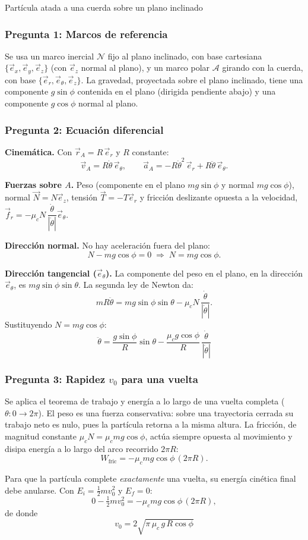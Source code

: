 \begin{solucion}{Partícula atada a una cuerda sobre un plano inclinado}
\subsubsection*{Pregunta 1: Marcos de referencia}

Se usa un marco inercial $\mathcal{N}$ fijo al plano inclinado, con base cartesiana
$\{\vec{e}_x,\vec{e}_y,\vec{e}_z\}$ (con $\vec{e}_z$ normal al plano), y un marco polar
$\mathcal{A}$ girando con la cuerda, con base $\{\vec{e}_r,\vec{e}_\theta,\vec{e}_z\}$. La
gravedad, proyectada sobre el plano inclinado, tiene una componente $g\sin\phi$ contenida en
el plano (dirigida pendiente abajo) y una componente $g\cos\phi$ normal al plano.

\subsubsection*{Pregunta 2: Ecuación diferencial}

\textbf{Cinemática.} Con $\vec{r}_A = R\,\vec{e}_r$ y $R$ constante:
$$\vec{v}_A = R\dot\theta\,\vec{e}_\theta,\qquad
\vec{a}_A = -R\dot\theta^2\,\vec{e}_r + R\ddot\theta\,\vec{e}_\theta.$$

\textbf{Fuerzas sobre $A$.} Peso (componente en el plano $mg\sin\phi$ y normal $mg\cos\phi$),
normal $\vec{N}=N\vec{e}_z$, tensión $\vec{T}=-T\vec{e}_r$ y fricción deslizante opuesta a la
velocidad, $\vec{f}_r = -\mu_c N\,\dfrac{\dot\theta}{|\dot\theta|}\vec{e}_\theta$.

\textbf{Dirección normal.} No hay aceleración fuera del plano:
$$N - mg\cos\phi = 0 \;\Longrightarrow\; N = mg\cos\phi.$$

\textbf{Dirección tangencial ($\vec{e}_\theta$).} La componente del peso en el plano, en la
dirección $\vec{e}_\theta$, es $mg\sin\phi\sin\theta$. La segunda ley de Newton da:
$$m R\ddot\theta = mg\sin\phi\sin\theta - \mu_c N\,\frac{\dot\theta}{|\dot\theta|}.$$
Sustituyendo $N=mg\cos\phi$:
$$\boxed{\;\ddot\theta = \frac{g\sin\phi}{R}\sin\theta - \frac{\mu_c g\cos\phi}{R}\,\frac{\dot\theta}{|\dot\theta|}\;}$$

\subsubsection*{Pregunta 3: Rapidez $v_0$ para una vuelta}

Se aplica el teorema de trabajo y energía a lo largo de una vuelta completa
($\theta:0\to2\pi$). El peso es una fuerza conservativa: sobre una trayectoria cerrada su
trabajo neto es nulo, pues la partícula retorna a la misma altura. La fricción, de magnitud
constante $\mu_c N=\mu_c mg\cos\phi$, actúa siempre opuesta al movimiento y disipa energía a
lo largo del arco recorrido $2\pi R$:
$$W_{\text{fric}} = -\mu_c mg\cos\phi\,(2\pi R).$$

Para que la partícula complete \emph{exactamente} una vuelta, su energía cinética final debe
anularse. Con $E_i=\tfrac12 m v_0^2$ y $E_f=0$:
$$0 - \tfrac12 m v_0^2 = -\mu_c mg\cos\phi\,(2\pi R),$$
de donde
$$\boxed{\;v_0 = 2\sqrt{\pi\,\mu_c\,g\,R\cos\phi}\;}$$
\end{solucion}
